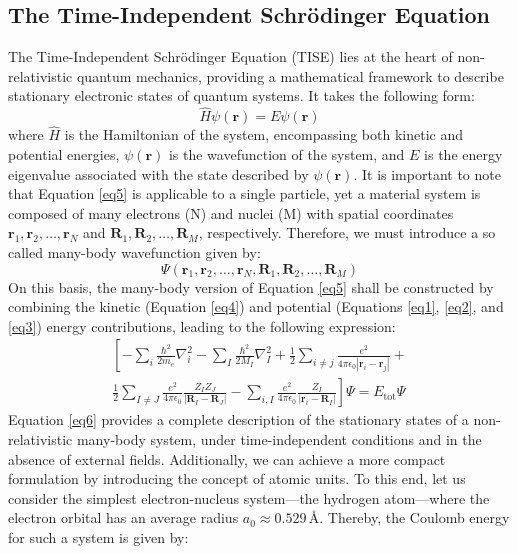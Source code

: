 \subsection{The Time-Independent Schrödinger Equation}
The Time-Independent Schrödinger Equation (TISE) lies at the heart of non-relativistic quantum mechanics, providing a mathematical framework to describe stationary electronic states of quantum systems. It takes the following form:
\begin{equation}
  \label{eq5}
  \hat{H} \psi(\mathbf{r}) = E \psi(\mathbf{r})
\end{equation}
where $\hat{H}$ is the Hamiltonian of the system, encompassing both kinetic and potential energies, $\psi(\mathbf{r})$ is the wavefunction of the system, and $E$ is the energy eigenvalue associated with the state described by $\psi(\mathbf{r})$.  It is important to note that Equation \ref{eq5} is applicable to a single particle, yet a material system is composed of many electrons (N) and nuclei (M) with spatial coordinates $\mathbf{r}_1, \mathbf{r}_2, \ldots, \mathbf{r}_N$ and $\mathbf{R}_1, \mathbf{R}_2, \ldots, \mathbf{R}_M$, respectively. Therefore, we must introduce a so called many-body wavefunction given by:
\begin{equation}
  \Psi(\mathbf{r}_1, \mathbf{r}_2, \ldots, \mathbf{r}_N, \mathbf{R}_1, \mathbf{R}_2, \ldots, \mathbf{R}_M)
  \label{eq5b}
\end{equation}
On this basis, the many-body version of Equation \ref{eq5} shall be constructed by combining the kinetic (Equation \ref{eq4}) and potential (Equations \ref{eq1}, \ref{eq2}, and \ref{eq3}) energy contributions, leading to the following expression:
\begin{equation}
  \label{eq6}
  \begin{split}
    \left[
      -\sum_i \frac{\hbar^2}{2m_e} \nabla_i^2 
      - \sum_I \frac{\hbar^2}{2M_I} \nabla_I^2 
      + \frac{1}{2} \sum_{i\neq j} \frac{e^2}{4\pi\epsilon_0 |\mathbf{r}_i - \mathbf{r}_j|} +\right. \\
      \left. \frac{1}{2} \sum_{I\neq J} \frac{e^2}{4\pi\epsilon_0} \frac{Z_I Z_J}{|\mathbf{R}_I - \mathbf{R}_J|} 
      - \sum_{i, I} \frac{e^2}{4\pi\epsilon_0} \frac{Z_I}{|\mathbf{r}_i - \mathbf{R}_I|}
    \right]\Psi = E_{\text{tot}} \Psi
  \end{split}
\end{equation}
Equation \ref{eq6} provides a complete description of the stationary states of a non-relativistic many-body system, under time-independent conditions and in the absence of external fields. Additionally, we can achieve a more compact formulation by introducing the concept of atomic units. To this end, let us consider the simplest electron-nucleus  system---the hydrogen atom---where the electron orbital has an average radius $a_0 \approx 0.529 \, \text{Å}$. Thereby, the Coulomb energy for such a system is given by:
